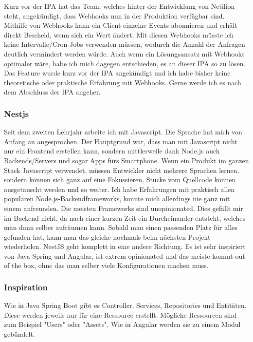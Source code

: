 \newline
Kurz vor der IPA hat das Team, welches hinter der Entwicklung von Netilion steht, angekündigt, dass Webhooks nun in der Produktion verfügbar sind. Mithilfe von Webhooks kann ein Client einzelne Events abonnieren und erhält direkt Bescheid, wenn sich ein Wert ändert. Mit diesen Webhooks müsste ich keine Intervalle/Cron-Jobs verwenden müssen, wodurch die Anzahl der Anfragen deutlich vermindert werden würde.
\newline
Auch wenn ein Lösungsansatz mit Webhooks optimaler wäre, habe ich mich dagegen entschieden, es an dieser IPA so zu lösen. Das Feature wurde kurz vor der IPA angekündigt und ich habe bisher keine theoretische oder praktische Erfahrung mit Webhooks. Gerne werde ich es nach dem Abschluss der IPA angehen.
\subsubsection{Nestjs}
Seit dem zweiten Lehrjahr arbeite ich mit Javascript. Die Sprache hat mich von Anfang an angesprochen. Der Hauptgrund war, dass man mit Javascript nicht nur ein Frontend erstellen kann, sondern mittlerweile dank Node.js auch Backends/Servers und sogar Apps fürs Smartphone. Wenn ein Produkt im ganzen Stack Javascript verwendet, müssen Entwickler nicht mehrere Sprachen lernen, sondern können sich ganz auf eine Fokussieren, Stücke vom Quellcode können ausgetauscht werden und so weiter.
\newline
Ich habe Erfahrungen mit praktisch allen populären Node.js-Backendframeworks, konnte mich allerdings nie ganz mit einem anfreunden. Die meisten Frameworks sind unopinionated. Dies gefällt mir im Backend nicht, da nach einer kurzen Zeit ein Durcheinander entsteht, welches man dann selber aufräumen kann. Sobald man einen passenden Platz für alles gefunden hat, kann man das gleiche nochmals beim nächsten Projekt wiederholen.
\newline
NestJS geht komplett in eine andere Richtung. Es ist sehr inspiriert von Java Spring und Angular, ist extrem opinionated und das meiste kommt out of the box, ohne das man selber viele Konfigurationen machen muss.
\subsubsection{Inspiration}
Wie in Java Spring Boot gibt es Controller, Services, Repositories und Entitäten. Diese werden jeweils nur für eine Ressource erstellt. Mögliche Ressourcen sind zum Beispiel "Users" oder "Assets". Wie in Angular werden sie zu einem Modul gebündelt.
